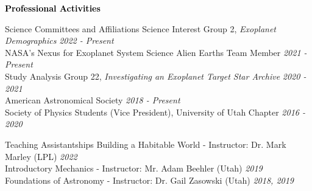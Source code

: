 \documentclass{resume} %
\newcommand{\mystrut}{\rule[-.3\baselineskip]{0pt}{\baselineskip}}
\renewenvironment{rSection}[1]{\mystrut{\textcolor{black}{{\large{\textbf{#1}}}}}
\vspace{-5pt} %
\begin{list}{}{
\setlength{\leftmargin}{0em}
}
\item[]
}{
\end{list}
}
\begin{document}
\begin{rSection}{Professional Activities} 
\begin{rSubsection}{Science Committees and Affiliations}{}{}{}
{Science Interest Group 2, \textit{Exoplanet Demographics} \hfill {\em 2022 - Present}}\\
{NASA’s Nexus for Exoplanet System Science Alien Earths Team Member \hfill {\em 2021 - Present}}\\
{Study Analysis Group 22, \textit{Investigating an Exoplanet Target Star Archive} \hfill {\em 2020 - 2021}}\\
{American Astronomical Society \hfill {\em 2018 - Present}}\\
{Society of Physics Students (Vice President), University of Utah Chapter \hfill {\em 2016 - 2020}}
\end{rSubsection} 
\begin{rSubsection}{Teaching Assistantships}{}{}{}
{Building a Habitable World - Instructor: Dr. Mark Marley (LPL) \hfill {\em 2022}}\\
{Introductory Mechanics - Instructor: Mr. Adam Beehler (Utah) \hfill {\em 2019}}\\
{Foundations of Astronomy - Instructor: Dr. Gail Zasowski (Utah) \hfill {\em 2018, 2019}}
\end{rSubsection}
\end{rSection}
\vspace{10pt}\hline
\vspace{0pt}




\end{document}
